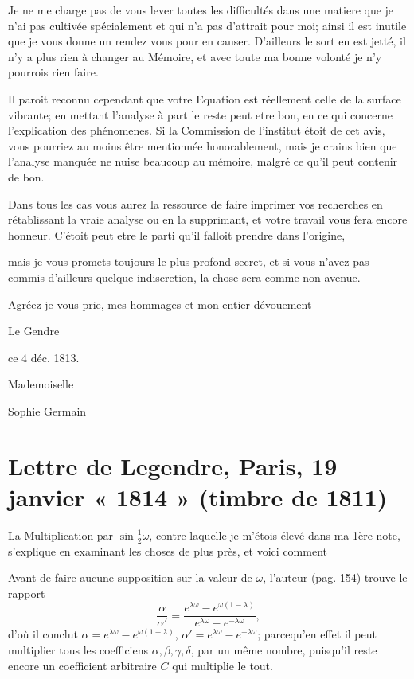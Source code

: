 \documentclass[11pt,a4paper]{article}
\begin{document}
Je ne me charge pas de vous lever toutes les difficultés dans une matiere
que je n'ai pas cultivée spécialement et qui n'a pas d'attrait pour moi;
ainsi il est inutile que je vous donne un rendez vous pour en causer.
D'ailleurs le sort en est jetté, il n'y a plus rien à changer au Mémoire, et
avec toute ma bonne volonté je n'y pourrois rien faire.

Il paroit reconnu cependant que votre Equation est réellement celle de la
 surface vibrante; en mettant l'analyse à part le reste peut
etre bon, en ce qui concerne l'explication des phénomenes. Si la Commission
de l'institut étoit de cet avis, vous pourriez au moins être mentionnée
honorablement, mais je crains bien que l'analyse manquée ne nuise beaucoup
au mémoire, malgré ce qu'il peut contenir de bon.

Dans tous les cas vous aurez la ressource de faire imprimer vos recherches
en rétablissant la vraie analyse ou en la supprimant, et votre travail vous
fera encore honneur. C'étoit peut etre le parti qu'il falloit prendre dans
l'origine,

mais je vous promets toujours le plus profond secret, et si vous n'avez pas
commis d'ailleurs quelque indiscretion, la chose sera comme non avenue.

Agréez je vous prie, mes hommages et mon entier dévouement

Le Gendre

ce 4 déc. 1813.

Mademoiselle

Sophie Germain


\section{Lettre de Legendre, Paris, 19 janvier « 1814 » (timbre de 1811)}

La Multiplication par $\sin \frac{1}{2}\omega$, contre laquelle je m'étois
élevé dans ma 1ère note, s'explique en examinant les choses de plus près, et
voici comment

Avant de faire aucune supposition sur la valeur de $\omega$, l'auteur (pag.
154) trouve le rapport
\[
\frac{\alpha}{\alpha'}
= \frac{e^{\lambda\omega} - e^{\omega(1 - \lambda)}}
       {e^{\lambda\omega} - e^{-\lambda\omega}},
\]
d'où il conclut $\alpha = e^{\lambda\omega} - e^{\omega(1 - \lambda)}$,
$\alpha' = e^{\lambda\omega} - e^{-\lambda\omega}$; parcequ'en effet il peut
multiplier tous les coefficiens $\alpha, \beta, \gamma, \delta$, par un même
nombre, puisqu'il reste encore un coefficient arbitraire $C$ qui multiplie le
tout.
\end{document}
